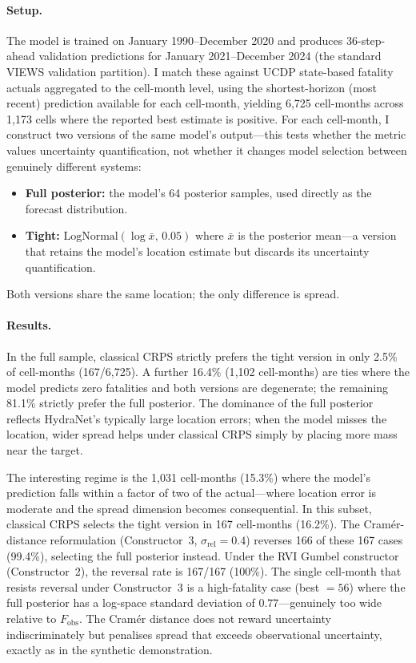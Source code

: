 \paragraph{Setup.}
The model is trained on January 1990--December 2020 and produces 36-step-ahead validation predictions for January 2021--December 2024 (the standard VIEWS validation partition). I match these against UCDP state-based fatality actuals aggregated to the cell-month level, using the shortest-horizon (most recent) prediction available for each cell-month, yielding 6{,}725 cell-months across 1{,}173 cells where the reported best estimate is positive. For each cell-month, I construct two versions of the same model's output---this tests whether the metric values uncertainty quantification, not whether it changes model selection between genuinely different systems:
\begin{itemize}
    \item \textbf{Full posterior:} the model's 64 posterior samples, used directly as the forecast distribution.
    \item \textbf{Tight:} $\text{LogNormal}(\log \bar{x}, \, 0.05)$ where $\bar{x}$ is the posterior mean---a version that retains the model's location estimate but discards its uncertainty quantification.
\end{itemize}
Both versions share the same location; the only difference is spread.

\paragraph{Results.}
In the full sample, classical CRPS strictly prefers the tight version in only 2.5\% of cell-months (167/6{,}725). A further 16.4\% (1{,}102 cell-months) are ties where the model predicts zero fatalities and both versions are degenerate; the remaining 81.1\% strictly prefer the full posterior. The dominance of the full posterior reflects HydraNet's typically large location errors; when the model misses the location, wider spread helps under classical CRPS simply by placing more mass near the target.

The interesting regime is the 1{,}031 cell-months (15.3\%) where the model's prediction falls within a factor of two of the actual---where location error is moderate and the spread dimension becomes consequential. In this subset, classical CRPS selects the tight version in 167 cell-months (16.2\%). The Cram\'er-distance reformulation (Constructor~3, $\sigma_\text{rel} = 0.4$) reverses 166 of these 167 cases (99.4\%), selecting the full posterior instead. Under the RVI Gumbel constructor (Constructor~2), the reversal rate is 167/167 (100\%). The single cell-month that resists reversal under Constructor~3 is a high-fatality case (best $= 56$) where the full posterior has a log-space standard deviation of $0.77$---genuinely too wide relative to $F_\text{obs}$. The Cram\'er distance does not reward uncertainty indiscriminately but penalises spread that exceeds observational uncertainty, exactly as in the synthetic demonstration.
